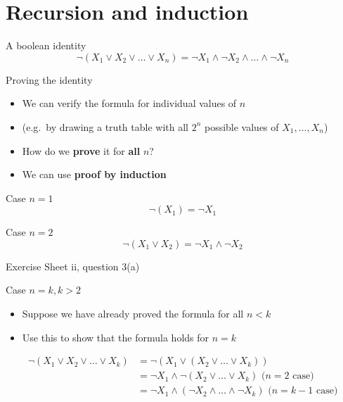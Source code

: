 \part{Recursion and induction}
\frame{\partpage}

\begin{frame}{A boolean identity}
    $$ \neg (X_1 \vee X_2 \vee \dots \vee X_n) = \neg X_1 \wedge \neg X_2 \wedge \dots \wedge \neg X_n $$
\end{frame}

\begin{frame}{Proving the identity}
    \begin{itemize}
        \pause\item We can verify the formula for individual values of $n$
        \pause\item (e.g.\ by drawing a truth table with all $2^n$ possible values of $X_1, \dots, X_n$)
        \pause\item How do we \textbf{prove} it for \textbf{all} $n$?
        \pause\item We can use \textbf{proof by induction}
    \end{itemize}
\end{frame}

\begin{frame}{Case $n=1$}
    $$ \neg (X_1) = \neg X_1 $$
\end{frame}

\begin{frame}{Case $n=2$}
    $$ \neg (X_1 \vee X_2) = \neg X_1 \wedge \neg X_2 $$
    \pause
    \begin{center}
        Exercise Sheet ii, question 3(a)
    \end{center}
\end{frame}

\begin{frame}{Case $n = k, k > 2$}
    \begin{itemize}
        \pause\item Suppose we have already proved the formula for all $n < k$
        \pause\item Use this to show that the formula holds for $n = k$
    \end{itemize}
    \pause
    \begin{align*}
        \neg (X_1 \vee X_2 \vee \dots \vee X_k) &= \neg (X_1 \vee (X_2 \vee \dots \vee X_k)) \\ 
            &= \neg X_1 \wedge \neg (X_2 \vee \dots \vee X_k) \text{ ($n=2$ case)} \\ 
            &= \neg X_1 \wedge (\neg X_2 \wedge \dots \wedge \neg X_k) \text{ ($n=k-1$ case)}
    \end{align*}
\end{frame}

